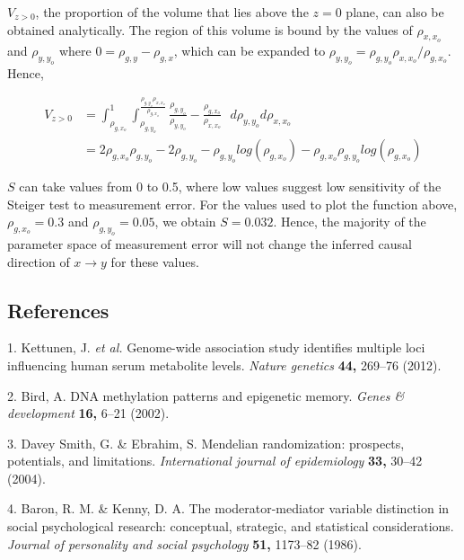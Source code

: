\documentclass[]{article}
\begin{document}
\(V_{z>0}\), the proportion of the volume that lies above the \(z=0\)
plane, can also be obtained analytically. The region of this volume is
bound by the values of \(\rho_{x,x_o}\) and \(\rho_{y,y_o}\) where
\(0 = \rho_{g,y} - \rho_{g,x}\), which can be expanded to
\(\rho_{y,y_o} = \rho_{g,y_o}\rho_{x,x_o} / \rho_{g,x_o}\). Hence,

\[
\begin{aligned}
V_{z>0} & = \int^1_{\rho_{g,x_o}} \int^{\frac{\rho_{g,y_o}\rho_{x,x_o}}{\rho_{g,x_o}}}_{\rho_{g,y_o}} \frac{\rho_{g,y_o}}{\rho_{y,y_o}} - \frac{\rho_{g,x_o}}{\rho_{x,x_o}}\,\,\,\, d\rho_{y,y_o}d\rho_{x,x_o} \\
& = 2\rho_{g,x_o}\rho_{g,y_o} - 2\rho_{g,y_o} - \rho_{g,y_o}log(\rho_{g,x_o}) - \rho_{g,x_o}\rho_{g,y_o}log(\rho_{g,x_o})
\end{aligned}
\]

\(S\) can take values from 0 to 0.5, where low values suggest low
sensitivity of the Steiger test to measurement error. For the values
used to plot the function above, \(\rho_{g,x_o} = 0.3\) and
\(\rho_{g,y_o} = 0.05\), we obtain \(S = 0.032\). Hence, the majority of
the parameter space of measurement error will not change the inferred
causal direction of \(x \rightarrow y\) for these values.

\subsection*{References}\label{references}

\hypertarget{refs}{}
\hypertarget{ref-Kettunen2012}{}
1. Kettunen, J. \emph{et al.} Genome-wide association study identifies
multiple loci influencing human serum metabolite levels. \emph{Nature
genetics} \textbf{44,} 269--76 (2012).

\hypertarget{ref-Bird2002}{}
2. Bird, A. DNA methylation patterns and epigenetic memory. \emph{Genes
\& development} \textbf{16,} 6--21 (2002).

\hypertarget{ref-DaveySmith2004}{}
3. Davey Smith, G. \& Ebrahim, S. Mendelian randomization: prospects,
potentials, and limitations. \emph{International journal of
epidemiology} \textbf{33,} 30--42 (2004).

\hypertarget{ref-Baron1986}{}
4. Baron, R. M. \& Kenny, D. A. The moderator-mediator variable
distinction in social psychological research: conceptual, strategic, and
statistical considerations. \emph{Journal of personality and social
psychology} \textbf{51,} 1173--82 (1986).
\end{document}
